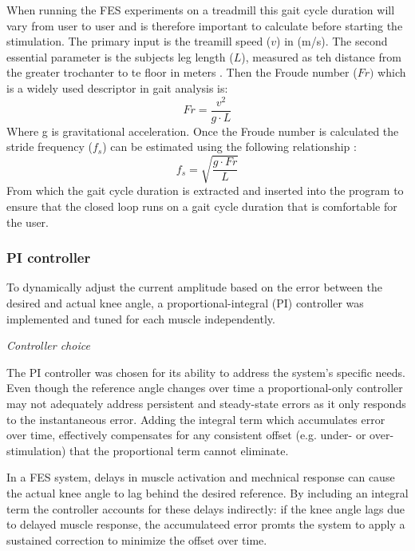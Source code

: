 When running the FES experiments on a treadmill this gait cycle duration will vary from user to user and is therefore important to calculate before starting the stimulation. The primary input is the treamill speed (\(v\)) in (m/s). The second essential parameter is the subjects leg length (\(L\)), measured as teh distance from the greater trochanter to te floor in meters . Then the Froude number (\(Fr)\) which is a widely used descriptor in gait analysis is:
\begin{equation}
    Fr = \frac{v^2}{g \cdot L}
\end{equation}
Where g is gravitational acceleration. Once the Froude number is calculated the stride frequency (\(f_s\)) can be estimated using the following relationship :
\begin{equation}
    f_s = \sqrt{\frac{g \cdot Fr}{L}}
\end{equation}
From which the gait cycle duration is extracted and inserted into the program to ensure that the closed loop runs on a gait cycle duration that is comfortable for the user.


\subsubsection{PI controller}
To dynamically adjust the current amplitude based on the error between the desired and actual knee angle, a proportional-integral (PI) controller was implemented and tuned for each muscle independently. 
\newline


\textit{Controller choice}

The PI controller was chosen for its ability to address the system's specific needs.  Even though the reference angle changes over time a proportional-only controller may not adequately address persistent and steady-state errors as it only responds to the instantaneous error. Adding the integral term which accumulates error over time, effectively compensates for any consistent offset (e.g. under- or over-stimulation) that the proportional term cannot eliminate. 


In a FES system, delays in muscle activation and mechnical response can cause the actual knee angle to lag behind the desired reference. By including an integral term the controller accounts for these delays indirectly: if the knee angle lags due to delayed muscle response, the accumulateed error promts the system to apply a sustained correction to minimize the offset over time.

